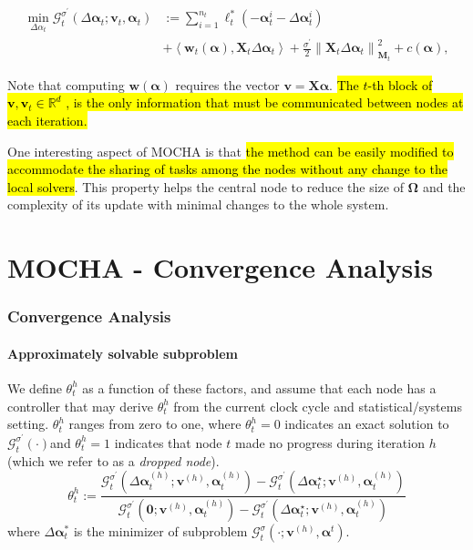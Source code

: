 \documentclass[UTF8,aspectratio=169,presentation]{ctexbeamer}
\makeatletter
\let\HL\hl
\renewcommand\hl{%
  \let\set@color\beamerorig@set@color
  \let\reset@color\beamerorig@reset@color
  \HL}
\makeatother
\begin{document}
\begin{frame}[t]

  \begin{align*}
    \min _{\Delta \alpha_{t}} \mathcal{G}_{t}^{\sigma^{\prime}}\left(\Delta \boldsymbol{\alpha}_{t} ; \mathbf{v}_{t}, \boldsymbol{\alpha}_{t}\right) &:=\sum_{i=1}^{n_{t}} \ell_{t}^{*}\left(-\boldsymbol{\alpha}_{t}^{i}-\Delta \boldsymbol{\alpha}_{t}^{i}\right) \\
  & +\left\langle\mathbf{w}_{t}(\boldsymbol{\alpha}), \mathbf{X}_{t} \Delta \boldsymbol{\alpha}_{t}\right\rangle+\frac{\sigma^{\prime}}{2}\left\|\mathbf{X}_{t} \Delta \boldsymbol{\alpha}_{t}\right\|_{\mathbf{M}_{t}}^{2}+c(\boldsymbol{\alpha}),
  \end{align*}

Note that computing $\mathbf{w}(\boldsymbol\alpha)$ requires 
  the vector $\mathbf v = \mathbf X \boldsymbol \alpha$. \hl{The $t$-th block of $\mathbf v, \mathbf v_t \in \mathbb R^d$ , is the only information that must be communicated
between nodes at each iteration.}

One interesting aspect of MOCHA is that \hl{the method can be easily modified to accommodate the
sharing of tasks among the nodes without any change to the local solvers}. This property helps the
central node to reduce the size of $\boldsymbol\Omega$ and the complexity of its update with minimal changes to the
whole system.
\end{frame}

\section{MOCHA - Convergence Analysis}

\begin{frame}[t]
  \frametitle{Convergence Analysis}
  \framesubtitle{Approximately solvable subproblem}
  We define $\theta_t^h$ as a function of these factors, and assume that each node has a controller that may derive $\theta_t^h$ from the current clock cycle and statistical/systems setting. $\theta_t^h$ ranges from zero to one, where $\theta^h_t = 0$ indicates an exact solution to $\mathcal G^{\sigma^{\prime}}_t(·)$and $\theta^h_t= 1$ indicates that node $t$ made no progress during iteration $h$ (which we refer to as a \textit{dropped node}).
  $$
\theta_{t}^{h}:=\frac{\mathcal{G}_{t}^{\sigma^{\prime}}\left(\Delta \boldsymbol{\alpha}_{t}^{(h)} ; \mathbf{v}^{(h)}, \boldsymbol{\alpha}_{t}^{(h)}\right)-\mathcal{G}_{t}^{\sigma^{\prime}}\left(\Delta \boldsymbol{\alpha}_{t}^{\star} ; \mathbf{v}^{(h)}, \boldsymbol{\alpha}_{t}^{(h)}\right)}{\mathcal{G}_{t}^{\sigma^{\prime}}\left(\mathbf{0} ; \mathbf{v}^{(h)}, \boldsymbol{\alpha}_{t}^{(h)}\right)-\mathcal{G}_{t}^{\sigma^{\prime}}\left(\Delta \boldsymbol{\alpha}_{t}^{\star} ; \mathbf{v}^{(h)}, \boldsymbol{\alpha}_{t}^{(h)}\right)}
$$
where $\Delta \boldsymbol\alpha^{*}_t$ is the minimizer of subproblem $\mathcal G_t^{\sigma}(· ; \mathbf v^{(h)} ,\boldsymbol\alpha^t )$.

\end{frame}
\end{document}
